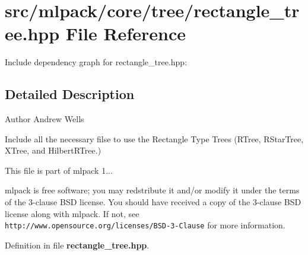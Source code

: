 \section{src/mlpack/core/tree/rectangle\-\_\-tree.hpp File Reference}
\label{rectangle__tree_8hpp}
Include dependency graph for rectangle\-\_\-tree.\-hpp\-:


\subsection{Detailed Description}
\begin{DoxyAuthor}{Author}
Andrew Wells
\end{DoxyAuthor}
Include all the necessary filse to use the Rectangle Type Trees (R\-Tree, R\-Star\-Tree, X\-Tree, and Hilbert\-R\-Tree.)

This file is part of mlpack 1...

mlpack is free software; you may redstribute it and/or modify it under the terms of the 3-\/clause B\-S\-D license. You should have received a copy of the 3-\/clause B\-S\-D license along with mlpack. If not, see {\tt http\-://www.\-opensource.\-org/licenses/\-B\-S\-D-\/3-\/\-Clause} for more information. 

Definition in file {\bf rectangle\-\_\-tree.\-hpp}.

